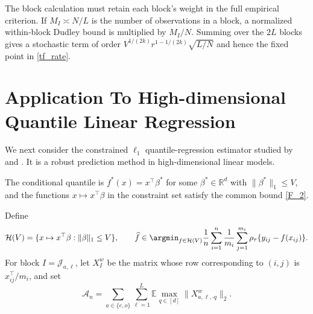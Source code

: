 \documentclass[twoside,11pt]{article}
\newenvironment{revision}{\color{revisionred}}{}
\begin{document}
\begin{revision}
The block calculation must retain each block's weight in the full empirical criterion. If $M_I\asymp N/L$ is the number of observations in a block, a normalized within-block Dudley bound is multiplied by $M_I/N$. Summing over the $2L$ blocks gives a stochastic term of order $V^{1/(2k)}r^{1-1/(2k)}\sqrt{L/N}$ and hence the fixed point in \eqref{tf_rate}.
\end{revision}


\section{Application To High-dimensional Quantile Linear Regression}

We next consider the constrained $\ell_1$ quantile-regression estimator studied by \citet{fu2000asymptotics} and \citet{belloni2011}. It is a robust prediction method in high-dimensional linear models.

\begin{assumption}\label{ass_hd}
\begin{revision}
The conditional quantile is $f^*(x)=x^\top\beta^*$ for some $\beta^*\in\mathbb R^d$ with $\|\beta^*\|_1\le V$, and the functions $x\mapsto x^\top\beta$ in the constraint set satisfy the common bound \eqref{F_2}.
\end{revision}
\end{assumption}

\begin{revision}
Define
\begin{equation}
 \mathcal H(V)=\{x\mapsto x^\top\beta:\|\beta\|_1\le V\},
 \qquad
 \widehat f\in\argmin_{f\in\mathcal H(V)}
 \frac1n\sum_{i=1}^n\frac1{m_i}\sum_{j=1}^{m_i}
 \rho_\tau\{y_{ij}-f(x_{ij})\}.                              \label{QR_est}
\end{equation}
For block $I=\mathcal J_{a,\ell}$, let $X_I^w$ be the matrix whose row corresponding to $(i,j)$ is $x_{ij}^\top/m_i$, and set
\begin{equation}
 \mathcal A_n=\sum_{a\in\{e,o\}}\sum_{\ell=1}^L
 \mathbb E\max_{q\in[d]}\|X^w_{a,\ell,\cdot q}\|_2.       \label{eq:An_linear_full}
\end{equation}
\label{eq:An_linear}
\end{revision}
\end{document}
